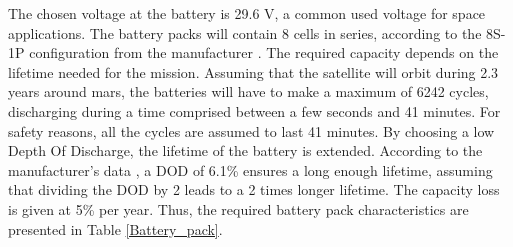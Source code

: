 \documentclass[a4paper, oneside, 11pt]{article}
\begin{document}
The chosen voltage at the battery is 29.6 V, a common used voltage for space applications. The battery packs will contain 8 cells in series, according to the 8S-1P configuration from the manufacturer \cite{Hi-capacity battery pack for nano satellites datasheet}. The required capacity depends on the lifetime needed for the mission. Assuming that the satellite will orbit during 2.3 years around mars, the batteries will have to make a maximum of 6242 cycles, discharging during a time comprised between a few seconds and 41 minutes. For safety reasons, all the cycles are assumed to last 41 minutes. By choosing a low Depth Of Discharge, the lifetime of the battery is extended. According to the manufacturer's data \cite{Lithium Ion 18650 cells for space flight products datasheet}, a DOD of 6.1\% ensures a long enough lifetime, assuming that dividing the DOD by 2 leads to a 2 times longer lifetime. The capacity loss is given at 5\% per year. Thus, the required battery pack characteristics are presented in Table \ref{Battery_pack}. 

\end{document}
